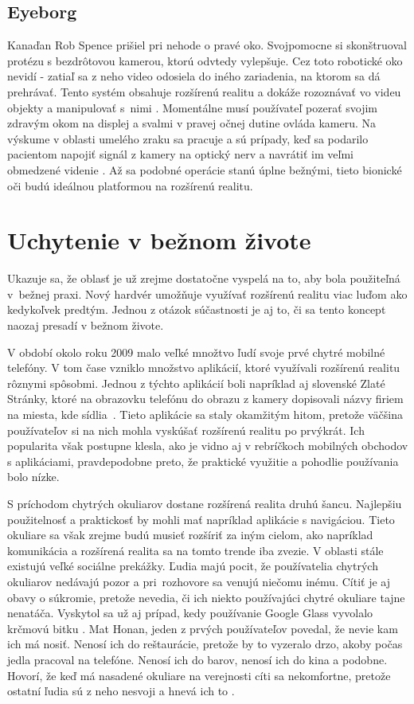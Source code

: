 \def\thepage{\arabic{page}}
\subsection{Eyeborg}

Kanaďan Rob Spence prišiel pri nehode o pravé oko. Svojpomocne si skonštruoval protézu s bezdrôtovou kamerou, ktorú odvtedy vylepšuje. Cez toto robotické oko nevidí - zatiaľ sa z neho video odosiela do iného zariadenia, na ktorom sa dá prehrávať. Tento systém obsahuje rozšírenú realitu a dokáže rozoznávať vo videu objekty a manipulovať s~nimi \cite{Eyeborg}. Momentálne musí používateľ pozerať svojim zdravým okom na displej a svalmi v pravej očnej dutine ovláda kameru. Na výskume v oblasti umelého zraku sa pracuje a sú prípady, keď sa podarilo pacientom napojiť signál z kamery na optický nerv a navrátiť im veľmi obmedzené videnie \cite{Dobelle00}. Až sa podobné operácie stanú úplne bežnými, tieto bionické oči budú ideálnou platformou na rozšírenú realitu.

\section{Uchytenie v bežnom živote}

Ukazuje sa, že oblasť je už zrejme dostatočne vyspelá na to, aby bola použiteľná v~bežnej praxi. Nový hardvér umožňuje využívať rozšírenú realitu viac luďom ako kedykoľvek predtým. Jednou z otázok súčastnosti je aj to, či sa tento koncept naozaj presadí v bežnom živote.

V období okolo roku 2009 malo veľké množtvo ľudí svoje prvé chytré mobilné telefóny. V tom čase vzniklo množstvo aplikácií, ktoré využívali rozšírenú realitu rôznymi spôsobmi. Jednou z týchto aplikácií boli napríklad aj slovenské Zlaté Stránky, ktoré na obrazovku telefónu do obrazu z kamery dopisovali názvy firiem na miesta, kde sídlia~\cite{Orgonas10}. Tieto aplikácie sa staly okamžitým hitom, pretože väčšina používateľov si na nich mohla vyskúšať rozšírenú realitu po prvýkrát. Ich popularita však postupne klesla, ako je vidno aj v rebríčkoch mobilných obchodov s aplikáciami, pravdepodobne preto, že praktické využitie a pohodlie používania bolo nízke.

S príchodom chytrých okuliarov dostane rozšírená realita druhú šancu. Najlepšiu použitelnosť a praktickosť by mohli mať napríklad aplikácie s navigáciou. Tieto okuliare sa však zrejme budú musieť rozšíriť za iným cielom, ako napríklad komunikácia a rozšírená realita sa na tomto trende iba zvezie. V oblasti stále existujú veľké sociálne prekážky. Ľudia majú pocit, že používatelia chytrých okuliarov nedávajú pozor a pri~rozhovore sa venujú niečomu inému. Cítiť je aj obavy o súkromie, pretože nevedia, či ich niekto používajúci chytré okuliare tajne nenatáča. Vyskytol sa už aj prípad, kedy používanie Google Glass vyvolalo krčmovú bitku \cite{Gross14}. Mat Honan, jeden z prvých používateľov povedal, že nevie kam ich má nosiť. Nenosí ich do reštaurácie, pretože by to vyzeralo drzo, akoby počas jedla pracoval na telefóne. Nenosí ich do barov, nenosí ich do kina a podobne. Hovorí, že keď má nasadené okuliare na verejnosti cíti sa nekomfortne, pretože ostatní ľudia sú z neho nesvoji a hnevá ich to \cite{Honan13}.

